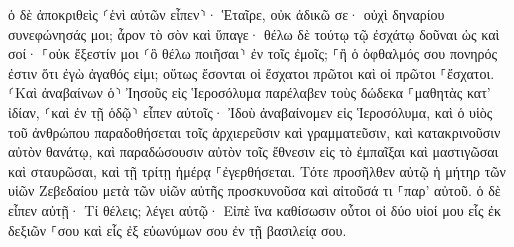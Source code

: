 \documentclass{openreader}
\begin{document}
ὁ δὲ ἀποκριθεὶς ⸂ἑνὶ αὐτῶν εἶπεν⸃· Ἑταῖρε, οὐκ ἀδικῶ σε· οὐχὶ δηναρίου συνεφώνησάς μοι; 
ἆρον τὸ σὸν καὶ ὕπαγε· θέλω δὲ τούτῳ τῷ ἐσχάτῳ δοῦναι ὡς καὶ σοί· 
⸀οὐκ ἔξεστίν μοι ⸂ὃ θέλω ποιῆσαι⸃ ἐν τοῖς ἐμοῖς; ⸀ἢ ὁ ὀφθαλμός σου πονηρός ἐστιν ὅτι ἐγὼ ἀγαθός εἰμι; 
οὕτως ἔσονται οἱ ἔσχατοι πρῶτοι καὶ οἱ πρῶτοι ⸀ἔσχατοι. 
⸂Καὶ ἀναβαίνων ὁ⸃ Ἰησοῦς εἰς Ἱεροσόλυμα παρέλαβεν τοὺς δώδεκα ⸀μαθητὰς κατ’ ἰδίαν, ⸂καὶ ἐν τῇ ὁδῷ⸃ εἶπεν αὐτοῖς· 
Ἰδοὺ ἀναβαίνομεν εἰς Ἱεροσόλυμα, καὶ ὁ υἱὸς τοῦ ἀνθρώπου παραδοθήσεται τοῖς ἀρχιερεῦσιν καὶ γραμματεῦσιν, καὶ κατακρινοῦσιν αὐτὸν θανάτῳ, 
καὶ παραδώσουσιν αὐτὸν τοῖς ἔθνεσιν εἰς τὸ ἐμπαῖξαι καὶ μαστιγῶσαι καὶ σταυρῶσαι, καὶ τῇ τρίτῃ ἡμέρᾳ ⸀ἐγερθήσεται. 
Τότε προσῆλθεν αὐτῷ ἡ μήτηρ τῶν υἱῶν Ζεβεδαίου μετὰ τῶν υἱῶν αὐτῆς προσκυνοῦσα καὶ αἰτοῦσά τι ⸀παρ’ αὐτοῦ. 
ὁ δὲ εἶπεν αὐτῇ· Τί θέλεις; λέγει αὐτῷ· Εἰπὲ ἵνα καθίσωσιν οὗτοι οἱ δύο υἱοί μου εἷς ἐκ δεξιῶν ⸀σου καὶ εἷς ἐξ εὐωνύμων σου ἐν τῇ βασιλείᾳ σου. 
\end{document}
